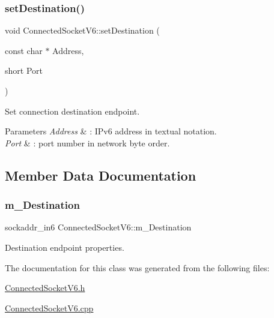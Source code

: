 \subsubsection{\texorpdfstring{set\+Destination()}{setDestination()}\hspace{0.1cm}{\footnotesize\ttfamily [3/3]}}
{\footnotesize\ttfamily void Connected\+Socket\+V6\+::set\+Destination (\begin{DoxyParamCaption}\item[{const char $\ast$}]{Address,  }\item[{short}]{Port }\end{DoxyParamCaption})}

Set connection destination endpoint. 
\begin{DoxyParams}{Parameters}
{\em Address} & \+: I\+Pv6 address in textual notation. \\
\hline
{\em Port} & \+: port number in network byte order. \\
\hline
\end{DoxyParams}


\subsection{Member Data Documentation}
\mbox{\label{classConnectedSocketV6_ab05802f2cded1638b11541be1e78942c}} 
\subsubsection{\texorpdfstring{m\+\_\+\+Destination}{m\_Destination}}
{\footnotesize\ttfamily sockaddr\+\_\+in6 Connected\+Socket\+V6\+::m\+\_\+\+Destination\hspace{0.3cm}{\ttfamily [protected]}}



Destination endpoint properties. 



The documentation for this class was generated from the following files\+:\begin{DoxyCompactItemize}
\item 
\hyperlink{ConnectedSocketV6_8h}{Connected\+Socket\+V6.\+h}\item 
\hyperlink{ConnectedSocketV6_8cpp}{Connected\+Socket\+V6.\+cpp}\end{DoxyCompactItemize}
